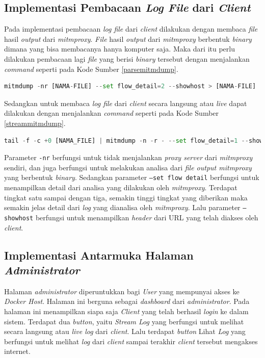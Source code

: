 \subsection{Implementasi Pembacaan \textit{Log File} dari \textit{Client}}
Pada implementasi pembacaan \textit{log file} dari \textit{client} dilakukan dengan membaca \textit{file} hasil \textit{output} dari \textit{mitmproxy}. \textit{File} hasil \textit{output} dari \textit{mitmproxy} berbentuk \textit{binary} dimana yang bisa membacanya hanya komputer saja. Maka dari itu perlu dilakukan pembacaan lagi \textit{file} yang berisi \textit{binary} tersebut dengan menjalankan \textit{command} seperti pada Kode Sumber \ref{parsemitmdump}.
\begin{lstlisting}[frame=single,tabsize=2,breaklines,captionpos=b,caption=Perintah untuk Membaca \textit{File Log} dari Mitmrproxy,language=Python,label=parsemitmdump]
mitmdump -nr [NAMA-FILE] --set flow_detail=2 --showhost > [NAMA-FILE]
\end{lstlisting}

Sedangkan untuk membaca \textit{log file} dari \textit{client} secara langsung atau \textit{live} dapat dilakukan dengan menjalankan \textit{command} seperti pada Kode Sumber \ref{streammitmdump}.
\begin{lstlisting}[frame=single,tabsize=2,breaklines,captionpos=b,caption=Perintah untuk Membaca \textit{File Log} dari \textit{Client},language=Python,label=streammitmdump]
tail -f -c +0 [NAMA_FILE] | mitmdump -n -r - --set flow_detail=1 --showhost
\end{lstlisting}

Parameter \texttt{-nr} berfungsi untuk tidak menjalankan \textit{proxy server} dari \textit{mitmproxy} sendiri, dan juga berfungsi untuk melakukan analisa dari \textit{file output mitmproxy} yang berbentuk \textit{binary}. Sedangkan parameter \texttt{--set flow detail} berfungsi untuk menampilkan detail dari analisa yang dilakukan oleh \textit{mitmproxy}. Terdapat tingkat satu sampai dengan tiga, semakin tinggi tingkat yang diberikan maka semakin jelas detail dari \textit{log} yang dianalisa oleh \textit{mitmproxy}. Lalu parameter \texttt{--showhost} berfungsi untuk menampilkan \textit{header} dari URL yang telah diakses oleh \textit{client}.

\subsection{Implementasi Antarmuka Halaman \textit{Administrator}}
Halaman \textit{administrator} diperuntukkan bagi \textit{User} yang mempunyai akses ke \textit{Docker Host}. Halaman ini berguna sebagai \textit{dashboard} dari \textit{administrator}. Pada halaman ini menampilkan siapa saja \textit{Client} yang telah berhasil \textit{login} ke dalam sistem. Terdapat dua \textit{button}, yaitu \textit{Stream Log} yang berfungsi untuk melihat secara langsung atau \textit{live log} dari \textit{client}. Lalu terdapat \textit{button} Lihat \textit{Log} yang berfungsi untuk melihat \textit{log} dari \textit{client} sampai terakhir \textit{client} tersebut mengakses internet.

